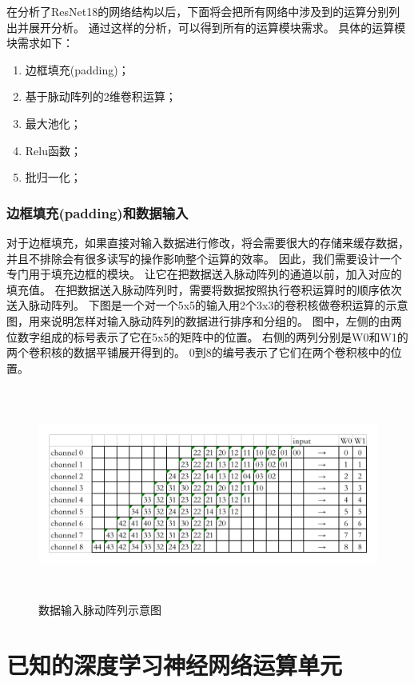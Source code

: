 在分析了ResNet18的网络结构以后，下面将会把所有网络中涉及到的运算分别列出并展开分析。
通过这样的分析，可以得到所有的运算模块需求。
具体的运算模块需求如下：
\begin{enumerate}
    \item 边框填充(padding)；
    \item 基于脉动阵列的2维卷积运算；
    \item 最大池化；
    \item Relu函数；
    \item 批归一化；
\end{enumerate}

\subsubsection{边框填充(padding)和数据输入}
对于边框填充，如果直接对输入数据进行修改，将会需要很大的存储来缓存数据，并且不排除会有很多读写的操作影响整个运算的效率。
因此，我们需要设计一个专门用于填充边框的模块。
让它在把数据送入脉动阵列的通道以前，加入对应的填充值。
在把数据送入脉动阵列时，需要将数据按照执行卷积运算时的顺序依次送入脉动阵列。
下图是一个对一个5x5的输入用2个3x3的卷积核做卷积运算的示意图，用来说明怎样对输入脉动阵列的数据进行排序和分组的。
图中，左侧的由两位数字组成的标号表示了它在5x5的矩阵中的位置。
右侧的两列分别是W0和W1的两个卷积核的数据平铺展开得到的。
0到8的编号表示了它们在两个卷积核中的位置。

\begin{figure}[htbp]
    \centering
    \includegraphics[width=15cm,height=7cm]{figures/input_systolic_array.png}
    \caption{数据输入脉动阵列示意图}
    \label{systolic}
\end{figure}





\section{已知的深度学习神经网络运算单元}

